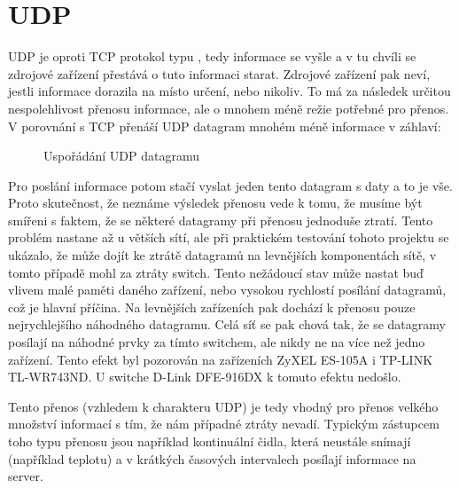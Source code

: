 
\section{UDP}
UDP  je oproti TCP protokol typu , tedy informace se vyšle a v tu chvíli se zdrojové zařízení přestává o tuto informaci starat. Zdrojové zařízení pak neví, jestli informace dorazila na místo určení, nebo nikoliv. To má za následek určitou nespolehlivost přenosu informace, ale o mnohem méně režie potřebné pro přenos. V porovnání s TCP přenáší UDP datagram mnohém méně informace v záhlaví:

\begin{figure}[H]
    \centering
	\caption{Uspořádání UDP datagramu}
	\label{fig:udp-datagram}
\end{figure}

Pro poslání informace potom stačí vyslat jeden tento datagram s daty a to je vše. Proto skutečnost, že neznáme výsledek přenosu vede k tomu, že musíme být smířeni s faktem, že se některé datagramy při přenosu jednoduše ztratí. Tento problém nastane až u větších sítí, ale při praktickém testování tohoto projektu se ukázalo, že může dojít ke ztrátě datagramů na levnějších komponentách sítě, v tomto případě mohl za ztráty switch. Tento nežádoucí stav může nastat buď vlivem malé paměti daného zařízení, nebo vysokou rychlostí posílání datagramů, což je hlavní příčina. Na levnějších zařízeních pak dochází k přenosu pouze nejrychlejšího náhodného datagramu. Celá síť se pak chová tak, že se datagramy posílají na náhodné prvky za tímto switchem, ale nikdy ne na více než jedno zařízení. Tento efekt byl pozorován na zařízeních ZyXEL ES-105A i TP-LINK TL-WR743ND. U switche D-Link DFE-916DX k tomuto efektu nedošlo.

Tento přenos (vzhledem k charakteru UDP) je tedy vhodný pro přenos velkého množství informací s tím, že nám případné ztráty nevadí. Typickým zástupcem toho typu přenosu jsou například kontinuální čidla, která neustále snímají (například teplotu) a v krátkých časových intervalech posílají informace na server.